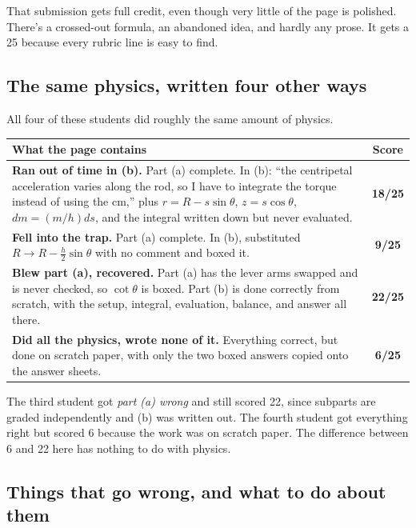 \documentclass[11pt]{article}
\begin{document}
That submission gets full credit, even though very little of the page is polished. There's
a crossed-out formula, an abandoned idea, and hardly any prose. It gets a 25 because every
rubric line is easy to find.

\subsection*{The same physics, written four other ways}

All four of these students did roughly the same amount of physics.

\begin{center}
\begin{longtable}{p{}c}
\hline
\textbf{What the page contains} & \textbf{Score} \\
\hline
\endhead
\textbf{Ran out of time in (b).} Part (a) complete. In (b): ``the centripetal acceleration
varies along the rod, so I have to integrate the torque instead of using the cm,'' plus
$r = R - s\sin\theta$, $z = s\cos\theta$, $dm = (m/h)ds$, and the integral written down but
never evaluated. & \textbf{18/25} \\[4pt]
\textbf{Fell into the trap.} Part (a) complete. In (b), substituted $R \to R -
\tfrac{h}{2}\sin\theta$ with no comment and boxed it. & \textbf{9/25} \\[4pt]
\textbf{Blew part (a), recovered.} Part (a) has the lever arms swapped and is never checked,
so $\cot\theta$ is boxed. Part (b) is done correctly from scratch, with the setup, integral,
evaluation, balance, and answer all there. & \textbf{22/25} \\[4pt]
\textbf{Did all the physics, wrote none of it.} Everything correct, but done on scratch
paper, with only the two boxed answers copied onto the answer sheets. & \textbf{6/25} \\
\hline
\end{longtable}
\end{center}

\begin{keybox}
The third student got \emph{part (a) wrong} and still scored 22, since subparts are graded
independently and (b) was written out. The fourth student got everything right but scored
6 because the work was on scratch paper. The difference between 6 and 22 here has nothing
to do with physics.
\end{keybox}

\subsection*{Things that go wrong, and what to do about them}
\end{document}
